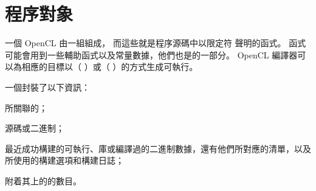 \section{程序對象}

一個 OpenCL 由一組組成，
而這些就是程序源碼中以限定符  聲明的函式。
  函式可能會用到一些輔助函式以及常量數據，他們也是的一部分。
 OpenCL 編譯器可以為相應的目標以{}（ {} ）或{}（ {} ）的方式生成可執行。

一個封裝了以下資訊：
\startigBase
\item 所關聯的；
\item {}源碼或二進制；
\item 最近成功構建的可執行、庫或編譯過的二進制數據，還有他們所對應的清單，以及所使用的構建選項和構建日誌；
\item 附着其上的的數目。
\stopigBase









